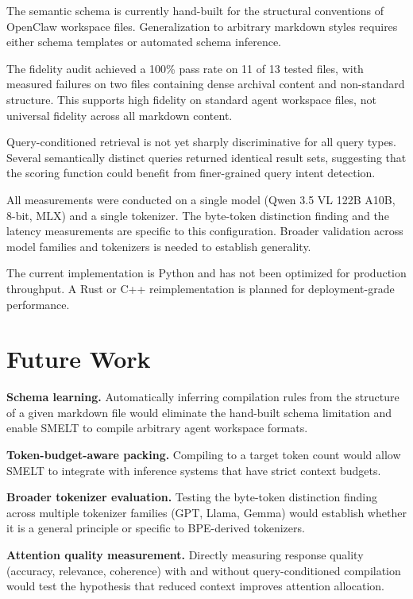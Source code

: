 \documentclass[11pt,a4paper]{article}
\begin{document}
The semantic schema is currently hand-built for the structural conventions of OpenClaw workspace files. Generalization to arbitrary markdown styles requires either schema templates or automated schema inference.

The fidelity audit achieved a 100\% pass rate on 11 of 13 tested files, with measured failures on two files containing dense archival content and non-standard structure. This supports high fidelity on standard agent workspace files, not universal fidelity across all markdown content.

Query-conditioned retrieval is not yet sharply discriminative for all query types. Several semantically distinct queries returned identical result sets, suggesting that the scoring function could benefit from finer-grained query intent detection.

All measurements were conducted on a single model (Qwen 3.5 VL 122B A10B, 8-bit, MLX) and a single tokenizer. The byte-token distinction finding and the latency measurements are specific to this configuration. Broader validation across model families and tokenizers is needed to establish generality.

The current implementation is Python and has not been optimized for production throughput. A Rust or C++ reimplementation is planned for deployment-grade performance.

\section{Future Work}

\textbf{Schema learning.} Automatically inferring compilation rules from the structure of a given markdown file would eliminate the hand-built schema limitation and enable SMELT to compile arbitrary agent workspace formats.

\textbf{Token-budget-aware packing.} Compiling to a target token count would allow SMELT to integrate with inference systems that have strict context budgets.

\textbf{Broader tokenizer evaluation.} Testing the byte-token distinction finding across multiple tokenizer families (GPT, Llama, Gemma) would establish whether it is a general principle or specific to BPE-derived tokenizers.

\textbf{Attention quality measurement.} Directly measuring response quality (accuracy, relevance, coherence) with and without query-conditioned compilation would test the hypothesis that reduced context improves attention allocation.
\end{document}
